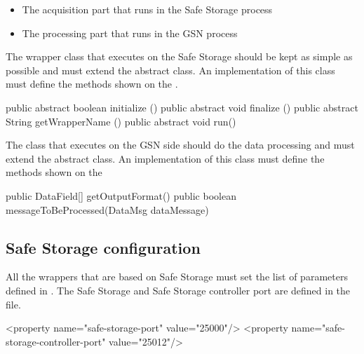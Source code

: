 \begin{itemize}
	\item The acquisition part that runs in the Safe Storage process
	\item The processing part that runs in the GSN process
\end{itemize}

The wrapper class that executes on the Safe Storage should be kept as simple as possible and must extend the
 abstract class.
An implementation of this class must define the methods shown on the .

\begin{javacode}[caption={Methods to implement for a Safe Storage Wrapper - Safe Storage Side}, label=listing:java:safestorage_methods_to_implement]
public abstract boolean initialize ()
public abstract void finalize ()
public abstract String getWrapperName () 
public abstract void run()
\end{javacode}

The class that executes on the GSN side should do the data processing and must extend the 
 abstract class.
An implementation of this class must define the methods shown on the 

\begin{javacode}[caption={Methods to implement for a Safe Storage Wrapper - GSN Side}, label=listing:java:safestorage_gsn_methods_to_implement]
public DataField[] getOutputFormat()
public boolean messageToBeProcessed(DataMsg dataMessage)
\end{javacode}

\subsection{Safe Storage configuration}

All the wrappers that are based on Safe Storage must set the list of parameters defined in .
The Safe Storage and Safe Storage controller port are defined in the  file.

\begin{xmlcode}[caption={Safe Storage ports}, label=listing:xml:safestorage_ports]
   <property name="safe-storage-port" value="25000"/>
   <property name="safe-storage-controller-port" value="25012"/>
\end{xmlcode}

